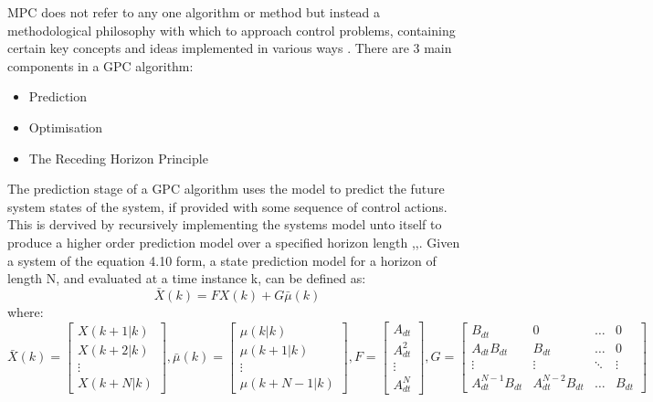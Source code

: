 \documentclass[12pt,a4paper,twoside]{report}
\begin{document}
				MPC does not refer to any one algorithm or method but instead a methodological philosophy with which to approach control problems, containing certain key concepts and ideas implemented in various ways \cite{26}. There are 3 main components in a GPC algorithm:
				\begin{itemize}
					\item 
						Prediction
					\item
						Optimisation
					\item
						The Receding Horizon Principle
				\end{itemize}
				\space
				The prediction stage of a GPC algorithm uses the model to predict the future system states of the system, if provided with some sequence of control actions. This is dervived by recursively implementing the systems model unto itself to produce a higher order prediction model over a specified horizon length \cite{25},\cite{26},\cite{27}. Given a system of the equation 4.10 form, a state prediction model for a horizon of length N, and evaluated at a time instance k, can be defined as:
				\begin{equation}
					\bar{X}(k) = F X(k) + G \bar{\mu}(k)
				\end{equation}
				where:
				\begin{equation}
					\bar{X}(k) = 
					\begin{bmatrix}
						X(k+1|k)\\
						X(k+2|k)\\
						\vdots\\
						X(k+N|k)
					\end{bmatrix}
					,
					\bar{\mu}(k) = 
					\begin{bmatrix}
						\mu(k|k)\\
						\mu(k+1|k)\\
						\vdots\\
						\mu(k+N-1|k)
					\end{bmatrix}
					,
					F =
					\begin{bmatrix}
						A_{dt}\\
						A_{dt}^{2}\\
						\vdots\\
						A_{dt}^{N}
					\end{bmatrix}
					,
					G =
					\begin{bmatrix}
						B_{dt} & 0 & \dots & 0\\
						A_{dt}B_{dt}& B_{dt}& \dots & 0\\
						\vdots& \vdots & \ddots & \vdots\\ 
						A_{dt}^{N-1}B_{dt}& A_{dt}^{N-2}B_{dt} & \dots & B_{dt}
					\end{bmatrix}
				\end{equation}
\end{document}
